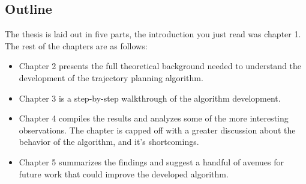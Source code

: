 \subsection{Outline}
The thesis is laid out in five parts, the introduction you just read was chapter 1. The rest of the chapters are as follows:
\begin{itemize}
    \item Chapter 2 presents the full theoretical background needed to understand the development of the trajectory planning algorithm.
    \item Chapter 3 is a step-by-step walkthrough of the algorithm development.
    \item Chapter 4 compiles the results and analyzes some of the more interesting observations. The chapter is capped off with a greater
    discussion about the behavior of the algorithm, and it's shortcomings.
    \item Chapter 5 summarizes the findings and suggest a handful of avenues for future work that could improve the developed algorithm.
\end{itemize}


\newpage